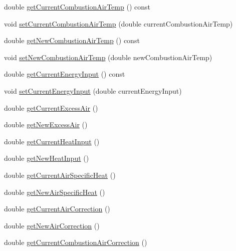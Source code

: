 \begin{DoxyCompactItemize}
\item 
double \hyperlink{class_efficiency_improvement_aa2f9d297f3c31e249c7a8035fd5602f1}{get\+Current\+Combustion\+Air\+Temp} () const
\item 
void \hyperlink{class_efficiency_improvement_a2fba09e47828dd8e6278251be8d1fa72}{set\+Current\+Combustion\+Air\+Temp} (double current\+Combustion\+Air\+Temp)
\item 
double \hyperlink{class_efficiency_improvement_a6a699fe87fec378962c2ee1505600dce}{get\+New\+Combustion\+Air\+Temp} () const
\item 
void \hyperlink{class_efficiency_improvement_a93705877dfad913c6282fbd31e66c41a}{set\+New\+Combustion\+Air\+Temp} (double new\+Combustion\+Air\+Temp)
\item 
double \hyperlink{class_efficiency_improvement_a8fcbdd3085f0a8b1120fb699522fcc05}{get\+Current\+Energy\+Input} () const
\item 
void \hyperlink{class_efficiency_improvement_a72c247fcd3f7791566205ec783e13d81}{set\+Current\+Energy\+Input} (double current\+Energy\+Input)
\item 
double \hyperlink{class_efficiency_improvement_a42cd83e1c57f065077e31f21b3552a76}{get\+Current\+Excess\+Air} ()
\item 
double \hyperlink{class_efficiency_improvement_afda194c72ccc7332ba4331f87f971b77}{get\+New\+Excess\+Air} ()
\item 
double \hyperlink{class_efficiency_improvement_af43c4706cb5cd67ce58e9c4356e4564c}{get\+Current\+Heat\+Input} ()
\item 
double \hyperlink{class_efficiency_improvement_a89e8480c7d2477ee249e847d4669ee2e}{get\+New\+Heat\+Input} ()
\item 
double \hyperlink{class_efficiency_improvement_a0d8b0d8968802a7994784380be376dfb}{get\+Current\+Air\+Specific\+Heat} ()
\item 
double \hyperlink{class_efficiency_improvement_a71ab10ba190cb99edb85fcd7f679e721}{get\+New\+Air\+Specific\+Heat} ()
\item 
double \hyperlink{class_efficiency_improvement_a640d0f4f9ecc8267678aa85bbafba655}{get\+Current\+Air\+Correction} ()
\item 
double \hyperlink{class_efficiency_improvement_a0339daa6d9cfc25e8da4f9efef73b3d8}{get\+New\+Air\+Correction} ()
\item 
double \hyperlink{class_efficiency_improvement_af50c396ac8ee18f594d6e8b8814f056a}{get\+Current\+Combustion\+Air\+Correction} ()
\item 

\end{DoxyCompactItemize}
